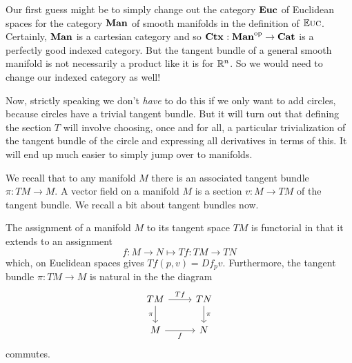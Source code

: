 \documentclass[DynamicalBook]{subfiles}
\begin{document}
Our first guess might be to simply change out the category $\textbf{Euc}$ of
Euclidean spaces for the category $\textbf{Man}$ of smooth manifolds in the
definition of $\mathbb{E}\textsc{uc}$. Certainly, $\textbf{Man}$ is a cartesian category and so
$\textbf{Ctx}_{} : \textbf{Man}^{\textnormal{op}} \to \textbf{Cat}$ is a perfectly good indexed category.
But the tangent bundle of a general smooth manifold is not necessarily a product
like it is for $\mathbb{R}^n$. So we would need to change our indexed category as well!

\iffalse
We could certainly do this, but if we only want to add circles then we can do
something less drastic. We can consider the cartesian category whose objects are
of the form $\rr^n \times T^m$, where $T^m = S^1 \times \cdots \times S^1$ is
the $m$-fold torus, and whose maps are smooth maps. Since the circle is
\emph{parallelizable}, which is to say that one can define a vector field on the
circle as a function in $\rr$, the tangent bundle of $\rr^n \times T^m$ is a
product of this space with $\rr^{n + m}$. 

\begin{definition}
  Let $\Cat{Tori}$ denote the category whose objects are $\rr^n \times T^m$ and
  smooth maps between them. We note that this is a cartesian category, with
  $$(\rr^n \times T^m) \times (\rr^k \times T^q) = \rr^{n + k} \times T^{m + q}.$$
\end{definition}

\begin{definition}\label{def.toric_diff_doctrine}
 The \emph{toric differential doctrine} consists of $\smctx{-} : \Cat{Tori}\op
 \to \Cat{Cat}$ together with the section $T$ given by $T(\rr^n \times T^m) =
 \rr^{n + m}$ and for $f : \rr^n \times T^m \to \rr^k \times T^q$, $Tf : (\rr^n
 \times T^m) \times \rr^{n + m} \to \rr^k \times T^q$ defined to be
 \[
Tf((p,t),(v, u)) \coloneqq ()
 \]
\end{definition}
\fi

Now, strictly speaking we don't \emph{have} to do this if we only want to add
circles, because circles have a trivial tangent bundle. But it will turn out
that defining the section $T$ will involve choosing, once and for all, a
particular trivialization of the tangent bundle of the circle and expressing all
derivatives in terms of this. It will end up much easier to simply jump over to manifolds.

We recall that to any manifold $M$ there is an associated tangent bundle $\pi :
TM \to M$. A vector field on a manifold $M$ is a section $v : M \to TM$ of the
tangent bundle. We recall a bit about tangent bundles now.
\begin{proposition}
The assignment of a manifold $M$ to its tangent space $TM$ is functorial in that
it extends to an assignment
\[
f : M \to N \mapsto Tf : TM \to TN
\]
which, on Euclidean spaces gives $Tf(p, v) = Df_p v$. Furthermore, the tangent
bundle $\pi : TM \to M$ is natural in the the diagram
\[
  \begin{tikzcd}
    TM \ar[d, "\pi"'] \ar[r, "Tf"]& TN \ar[d, "\pi"] \\
    M \ar[r, "f"'] & N
  \end{tikzcd}
\]
commutes.
\end{proposition}
\end{document}
